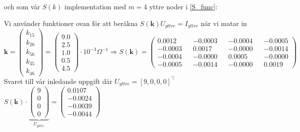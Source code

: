 \documentclass{assignment}
\def\code#1{\texttt{#1}}
\begin{document}
och som vår $S(k)$ implementation med $m=4$ yttre noder i \cref{S_func}:

Vi använder funktioner ovan för att beräkna 
$S(\mathbf{k})U_{yttre}=I_{yttre}$ när vi matar in
\\ $\mathbf{k} = 
\begin{pmatrix}
    k_{15} \\ k_{26} \\ k_{56} \\ k_{35} \\ k_{46}
\end{pmatrix}=
\begin{pmatrix}
    9.0 \\ 2.5 \\ 1.0 \\ 0.5 \\ 4.5
\end{pmatrix}\cdot 10^{-3}\Omega^{-1} \Longrightarrow 
S(\mathbf{k}) = 
\begin{pmatrix}
    0.0012 && -0.0003 && -0.0004 && -0.0005
   \\ -0.0003 && 0.0017 && -0.0000 && -0.0014
   \\ -0.0004 && -0.0000 && 0.0005 && -0.0000
   \\ -0.0005 && -0.0014 && -0.0000 && 0.0019
\end{pmatrix}
$
\\ Svaret till vår inledande uppgift där $U_{yttre}=[9,0,0,0]^\top$
\\$
S(\mathbf{k})
\cdot
\underbrace{ 
\begin{pmatrix}
    9
    \\ 0
    \\ 0
    \\ 0
\end{pmatrix}}_{U_{yttre}}
= 
\begin{pmatrix}
    0.0107
   \\-0.0024
   \\-0.0039
   \\-0.0044
\end{pmatrix}
$
\newpage
\end{document}
